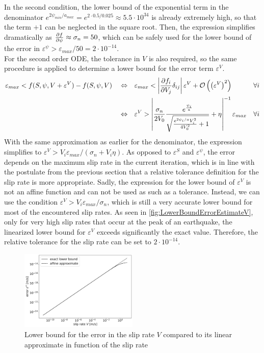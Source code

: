 In the second condition, the lower bound of the exponential term in the denominator $e^{2\psi_{min}/a_{max}} = e^{2 \cdot 0.5 / 0.025} \approx 5.5\cdot10^{34}$ is already extremely high, so that the term $+1$ can be neglected in the square root. Then, the expression simplifies dramatically as $\pdv{f}{\psi} \approx \sigma_n = 50$, which can be safely used for the lower bound of the error in $\varepsilon^\psi > \varepsilon_{max}/50 = 2\cdot10^{-14}$. \\
For the second order ODE, the tolerance in $V$ is also required, so the same procedure is applied to determine a lower bound for the error term $\varepsilon^V$.
\begin{align}
	&\varepsilon_{max} < f(S,\psi,V+\varepsilon^{V}) - f(S,\psi,V)
	&&\Leftrightarrow&&
	\varepsilon_{max} < \left|\pdv{f_i}{V_j}\delta_{ij}\right|\varepsilon^V + \mathcal{O}\left(\left(\varepsilon^V\right)^2\right) & \forall i \\
	&&&\Leftrightarrow &&
	\varepsilon^V > \left|\frac{\sigma_n}{2V_0}\frac{ e^{\frac{\psi_i}{a}}}{\sqrt{\frac{e^{2\psi_i/a}V_i^2}{4V_0^2} + 1}} + \eta\right|^{-1}\varepsilon_{max} & \forall i
\end{align}
With the same approximation as earlier for the denominator, the expression simplifies to $\varepsilon^V > V_i\varepsilon_{max}/(\sigma_n + V_i\eta)$. As opposed to $\varepsilon^S$ and $\varepsilon^\psi$, the error depends on the maximum slip rate in the current iteration, which is in line with the postulate from the previous section that a relative tolerance definition for the slip rate is more appropriate. Sadly, the expression for the lower bound of $\varepsilon^V$ is not an affine function and can not be used as such as a tolerance. Instead, we can use the condition $\varepsilon^V > V_i\varepsilon_{max}/\sigma_n$, which is still a very accurate lower bound for most of the encountered slip rates. As seen in \autoref{fig:LowerBoundErrorEstimateV}, only for very high slip rates that occur at the peak of an earthquake, the linearized lower bound for $\varepsilon^V$ exceeds significantly the exact value. Therefore, the relative tolerance for the slip rate can be set to $2\cdot10^{-14}$.
\begin{figure}[H]
	\centering
	\includegraphics[width=0.5\textwidth]{images/ErrorRelationPSI_VAbsoluteRelative.png}
	\caption{Lower bound for the error in the slip rate $V$ compared to its linear approximate in function of the slip rate}
	\label{fig:LowerBoundErrorEstimateV}
\end{figure}
